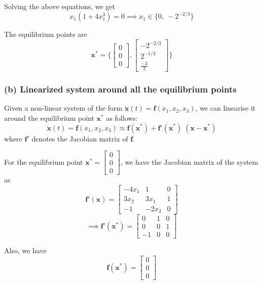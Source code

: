 Solving the above equations, we get
\[
    x_1(1 + 4x_1^3) = 0
    \implies
    x_1 \in \{ 0, \ -2^{-2/3} \}
\]

The equilibrium points are
\[
    \boxed{
        \mathbf{x^*} =
        \Bigg \{
        \begin{bmatrix}
            0 \\
            0 \\
            0
        \end{bmatrix},
        \begin{bmatrix}
            -2^{-2/3} \\
            2^{-1/3}  \\
            \frac{-3}{2}
        \end{bmatrix}
        \Bigg \}
    }
\]

\subsubsection*{(b) Linearized system around all the equilibrium points}

Given a non-linear system of the form \( \mathbf{\dot x}(t) = \mathbf{f}(x_1, x_2, x_3) \), we can linearise it around the equilibrium point \( \mathbf{x^*} \) as follows:
\[
    \mathbf{\dot x}(t) = \mathbf{f}(x_1, x_2, x_3) \approx \mathbf{f}(\mathbf{x^*}) + \mathbf{f'}(\mathbf{x^*})\; (\mathbf{x} - \mathbf{x^*})
\]
where \(\mathbf{f'}\) denotes the Jacobian matrix of \(\mathbf{f}\).

For the equilibrium point \( \mathbf{x^*} = \begin{bmatrix} 0 \\ 0 \\ 0 \end{bmatrix} \), we have the Jacobian matrix of the system as
\[
    \mathbf{f'}(\mathbf{x}) =
    \begin{bmatrix}
        -4x_1 & 1     & 0 \\
        3x_2  & 3x_1  & 1 \\
        -1    & -2x_2 & 0
    \end{bmatrix}
\]
\[
    \implies
    \mathbf{f'}(\mathbf{x^*}) =
    \begin{bmatrix}
        0  & 1 & 0 \\
        0  & 0 & 1 \\
        -1 & 0 & 0
    \end{bmatrix}
\]

Also, we have
\[
    \mathbf{f}(\mathbf{x^*}) =
    \begin{bmatrix}
        0 \\
        0 \\
        0
    \end{bmatrix}
\]

